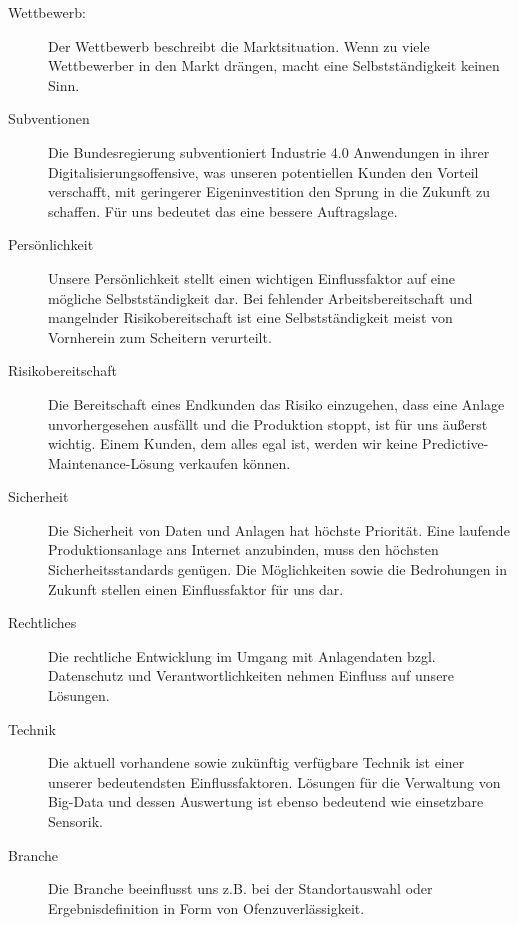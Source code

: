 \begin{description}
\item[Wettbewerb:]{Der Wettbewerb beschreibt die Marktsituation. Wenn zu viele Wettbewerber in den Markt drängen, macht eine Selbstständigkeit keinen Sinn.}

\item[Subventionen]{Die Bundesregierung subventioniert Industrie 4.0 Anwendungen in ihrer Digitalisierungsoffensive, was unseren potentiellen Kunden den Vorteil verschafft, mit geringerer Eigeninvestition den Sprung in die Zukunft zu schaffen. Für uns bedeutet das eine bessere Auftragslage.}

\item[Persönlichkeit]{Unsere Persönlichkeit stellt einen wichtigen Einflussfaktor auf eine mögliche Selbstständigkeit dar. Bei fehlender Arbeitsbereitschaft und mangelnder Risikobereitschaft ist eine Selbstständigkeit meist von Vornherein zum Scheitern verurteilt.}

\item[Risikobereitschaft]{Die Bereitschaft eines Endkunden das Risiko einzugehen, dass eine Anlage unvorhergesehen ausfällt und die Produktion stoppt, ist für uns äußerst wichtig. Einem Kunden, dem alles egal ist, werden wir keine Predictive-Maintenance-Lösung verkaufen können.}

\item[Sicherheit]{Die Sicherheit von Daten und Anlagen hat höchste Priorität. Eine laufende Produktionsanlage ans Internet anzubinden, muss den höchsten Sicherheitsstandards genügen. Die Möglichkeiten sowie die Bedrohungen in Zukunft stellen einen Einflussfaktor für uns dar.}

\item[Rechtliches]{Die rechtliche Entwicklung im Umgang mit Anlagendaten bzgl. Datenschutz und Verantwortlichkeiten nehmen Einfluss auf unsere Lösungen.}

\item[Technik]{Die aktuell vorhandene sowie zukünftig verfügbare Technik ist einer unserer bedeutendsten Einflussfaktoren. Lösungen für die Verwaltung von Big-Data und dessen Auswertung ist ebenso bedeutend wie einsetzbare Sensorik.}

\item[Branche]{Die Branche beeinflusst uns z.B. bei der Standortauswahl oder Ergebnisdefinition in Form von Ofenzuverlässigkeit.}
\end{description}

